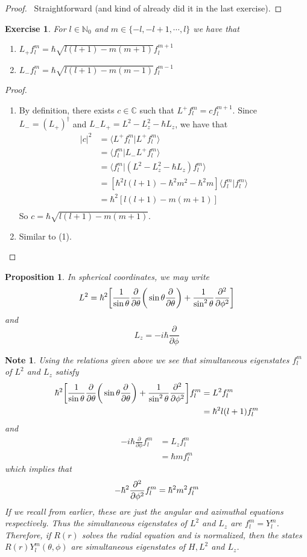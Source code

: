 \documentclass[12pt]{amsart}
\newtheorem{prop}[thm]{Proposition}
\newtheorem{note}[thm]{Note}
\newtheorem{ex}[thm]{Exercise}
\renewcommand{\r}{\rangle}
\renewcommand{\l}{\langle}
\newcommand{\C}{\mathbb{C}}
\newcommand{\N}{\mathbb{N}}
\newcommand{\p}[1]{\frac{\partial}{\partial{#1}}}
\begin{document}
\begin{proof}\
Straightforward (and kind of already did it in the last exercise). 
\end{proof}

\begin{ex}
For $l \in \N_0$ and $m \in \{-l, -l+1, \cdots, l\}$ we have that 
\begin{enumerate}
\item $L_{+} f_l^m = \hbar \sqrt{l(l+1)-m(m + 1)} f_l^{m+ 1}$
\item $L_{-} f_l^m = \hbar \sqrt{l(l+1)-m(m - 1)} f_l^{m- 1}$
\end{enumerate}
\end{ex}

\begin{proof}
\begin{enumerate}
\item By definition, there exists $c \in \C$ such that $L^+ f_l^m = c f_l^{m+1}$. Since $L_- = (L_+)^{\dagger}$ and $L_-L_+ = L^2 -L_z^2 -\hbar L_z$, we have that 
\begin{align*}
|c|^2 
&= \l L^+ f_l^m | L^+ f_l^m \r \\
&= \l f_l^m | L_- L^+ f_l^m \r \\
&= \l f_l^m | (L^2 -L_z^2 -\hbar L_z) f_l^m \r \\
&= [\hbar^2l(l+1) - \hbar^2 m^2 - \hbar^2m] \l f_l^m | f_l^m \r \\
&= \hbar^2[l(l+1) - m(m + 1)] \\
\end{align*}
So $c = \hbar\sqrt{l(l+1) - m(m + 1)}$.
\item Similar to (1).
\end{enumerate}
\end{proof}

\begin{prop}
In spherical coordinates, we may write $$L^2 = \hbar^2\bigg[ \frac{1}{\sin \theta }\p{\theta} \bigg( \sin \theta \p{\theta} \bigg) + \frac{1}{\sin^2 \theta} \pdv[2]{}{\phi}\bigg]$$ and $$L_z = -i\hbar \p{\phi}$$
\end{prop}

\begin{note}
Using the relations given above we see that simultaneous eigenstates $f_l^m$ of $L^2$ and $L_z$ satisfy 
\begin{align*}
\hbar^2\bigg[ \frac{1}{\sin \theta }\p{\theta} \bigg( \sin \theta \p{\theta} \bigg) + \frac{1}{\sin^2 \theta} \pdv[2]{}{\phi}\bigg] f_l^m 
&= L^2 f_l^m \\
&= \hbar^2 l(l+1) f_l^m 
\end{align*}
and 
\begin{align*}
-i \hbar \p{\phi} f_l^m 
&= L_z f_l^m \\
&= \hbar m f_l^m 
\end{align*}
which implies that $$-\hbar^2 \pdv[2]{}{\phi}f_l^m  = \hbar^2 m^2 f_l^m $$
If we recall from earlier, these are just the angular and azimuthal equations respectively. Thus the simultaneous eigenstates of $L^2$ and $L_z$ are $f_l^m = Y_l^m$. Therefore, if $R(r)$ solves the radial equation and is normalized, then the states $R(r)Y_l^m(\theta, \phi)$ are simultaneous eigenstates of $H, L^2$ and $L_z$.
\end{note}
\end{document}
